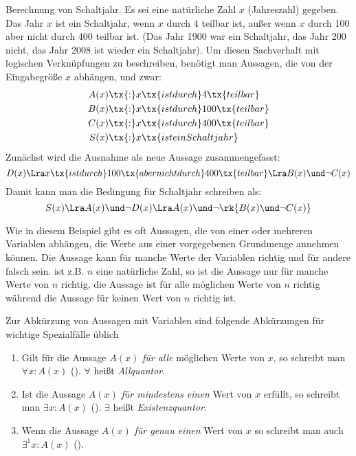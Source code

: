 \begin{example}
Berechnung von Schaltjahr. Es sei eine natürliche Zahl $x$ (Jahreszahl) gegeben. Das Jahr $x$ ist ein Schaltjahr, wenn $x$ durch 4 teilbar ist, außer wenn $x$ durch 100 aber nicht durch 400 teilbar ist. (Das Jahr 1900 war ein Schaltjahr, das Jahr 200 nicht, das Jahr 2008 ist wieder ein Schaltjahr). Um diesen Sachverhalt mit logischen Verknüpfungen zu beschreiben, benötigt man Aussagen, die von der Eingabegröße $x$ abhängen, und zwar:
\begin{align*}
A(x)\tx{: } & x \tx{ ist durch } 4 \tx{ teilbar}\\
B(x)\tx{: } & x \tx{ ist durch } 100 \tx{ teilbar}\\
C(x)\tx{: } & x \tx{ ist durch } 400 \tx{ teilbar}\\
S(x)\tx{: } & x \tx{ ist ein Schaltjahr}
\end{align*}
Zunächst wird die Ausnahme  als neue Aussage zusammengefasst:
\[D(x) \Lra x \tx{ ist durch } 100 \tx{ aber nicht durch } 400 \tx{ teilbar} \Lra B(x) \und \neg C(x)\]
Damit kann man die Bedingung für Schaltjahr schreiben als:
\[S(x) \Lra A(x) \und \neg D(x) \Lra A(x) \und \neg \rk{B(x) \und \neg C(x)}\]
\end{example}

Wie in diesem Beispiel gibt es oft Aussagen, die von einer oder mehreren Variablen abhängen, die Werte aus einer vorgegebenen Grundmenge annehmen können. Die Aussage kann für manche Werte der Variablen richtig und für andere falsch sein. ist \ac{z.B.} $n$ eine natürliche Zahl, so ist die Aussage  nur für manche Werte von $n$ richtig, die Aussage  ist für alle möglichen Werte von $n$ richtig während die Aussage  für keinen Wert von $n$ richtig ist.

Zur Abkürzung von Aussagen mit Variablen sind folgende Abkürzungen für wichtige Spezialfälle üblich
\begin{enumerate}
\item Gilt für die Aussage $A(x)$ \emph{für alle} möglichen Werte von $x$, so schreibt man $\forall x : A(x)$ (). $\forall$ heißt \emph{Allquantor}.
\item Ist die Aussage $A(x)$ \emph{für mindestens einen} Wert von $x$ erfüllt, so schreibt man $\exists x : A(x)$ (). $\exists$ heißt \emph{Existenzquantor}.
\item Wenn die Aussage $A(x)$ \emph{für genau einen} Wert von $x$ so schreibt man auch $\exists^1 x : A(x)$ ().
\end{enumerate}

